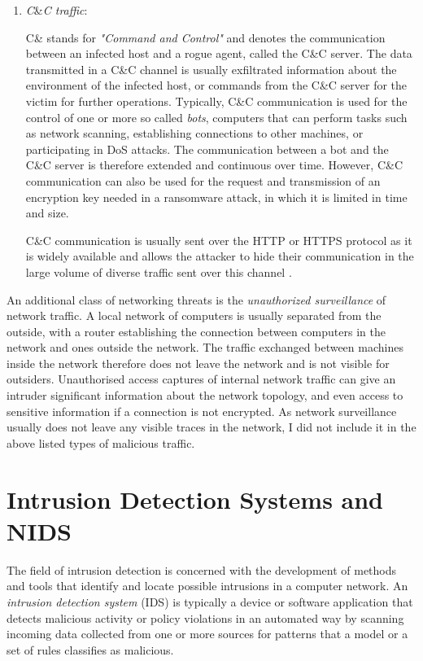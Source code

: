 \documentclass[a4paper,12pt,twoside]{report}
\begin{document}
\begin{enumerate}
\item \textit{C}\&\textit{C traffic}: 

C\& stands for \textit{"Command and Control"} and denotes the communication between an infected host and a rogue agent, called the C\&C server. The data transmitted in a C\&C channel is usually exfiltrated information about the environment of the infected host, or commands from the C\&C server for the victim for further operations. Typically, C\&C communication is used for the control of one or more so called \textit{bots}, computers that can perform tasks such as network scanning, establishing connections to other machines, or participating in DoS attacks. The communication between a bot and the C\&C server is therefore extended and continuous over time. However, C\&C communication can also be used for the request and transmission of an encryption key needed in a ransomware attack, in which it is limited in time and size. 

C\&C communication is usually sent over the HTTP or HTTPS protocol as it is widely available and allows the attacker to hide their communication in the large volume of diverse traffic sent over this channel \cite{lamprakis2017unsupervised}.

\end{enumerate}

An additional class of networking threats is the \textit{unauthorized surveillance} of network traffic. A local network of computers is usually separated from the outside, with a router establishing the connection between computers in the network and ones outside the network. The traffic exchanged between machines inside the network therefore does not leave the network and is not visible for outsiders. Unauthorised access captures of internal network traffic can give an intruder significant information about the network topology, and even access to sensitive information if a connection is not encrypted. As network surveillance usually does not leave any visible traces in the network, I did not include it in the above listed types of malicious traffic. 


\section{Intrusion Detection Systems and NIDS}

The field of intrusion detection is concerned with the development of methods and tools that identify and locate possible intrusions in a computer network. An \textit{intrusion detection system} (IDS) is typically a device or software application that detects malicious activity or policy violations in an automated way by scanning incoming data collected from one or more sources for patterns that a model or a set of rules classifies as malicious.
\end{document}
